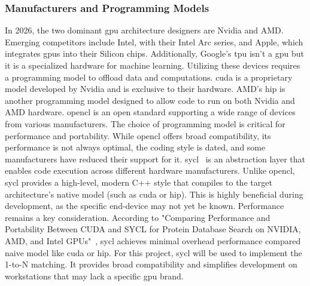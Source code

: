 \subsubsection{Manufacturers and Programming Models}
In 2026, the two dominant \acrshort{gpu} architecture designers are Nvidia and AMD. Emerging competitors include Intel, with their Intel Arc series, and Apple, which integrates \acrshort{gpu}s into their Silicon chips.
Additionally, Google's \acrfull{tpu} isn't a \acrshort{gpu} but it is a specialized hardware for machine learning.
\mypar
Utilizing these devices requires a programming model to offload data and computations. \acrshort{cuda} is a proprietary model developed by Nvidia and is exclusive to their hardware. AMD's \acrshort{hip} is another programming model designed to allow code to run on both Nvidia and AMD hardware. \acrshort{opencl} is an open standard supporting a wide range of devices from various manufacturers.
\mypar
The choice of programming model is critical for performance and portability. While \acrshort{opencl} offers broad compatibility, its performance is not always optimal, the coding style is dated, and some manufacturers have reduced their support for it.
\mypar
\acrshort{sycl}~\cite{sycl2020} is an abstraction layer that enables code execution across different hardware manufacturers. Unlike \acrshort{opencl}, \acrshort{sycl} provides a high-level, modern C++ style that compiles to the target architecture's native model (such as \acrshort{cuda} or \acrshort{hip}). This is highly beneficial during development, as the specific end-device may not yet be known.
\mypar
Performance remains a key consideration. According to "Comparing Performance and Portability Between CUDA and SYCL for Protein Database Search on NVIDIA, AMD, and Intel GPUs"~\cite{syclVsCuda2023}, \acrshort{sycl} achieves minimal overhead performance compared naive model like \acrshort{cuda} or \acrshort{hip}. 
\mypar
For this project, \acrshort{sycl} will be used to implement the 1-to-N matching. It provides broad compatibility and simplifies development on workstations that may lack a specific \acrshort{gpu} brand.


